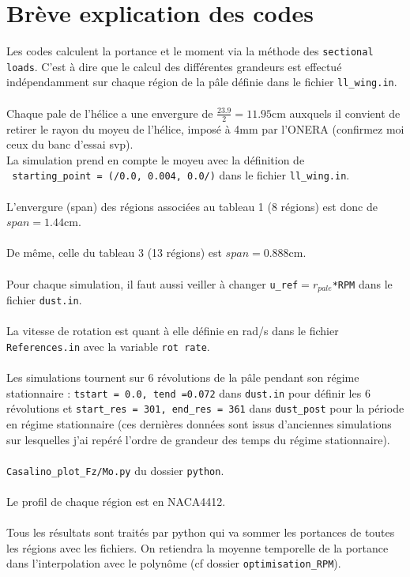 \documentclass{article}
\begin{document}
	\section{Brève explication des codes}
	Les codes calculent la portance et le moment via la méthode des \verb !sectional loads!. C'est à dire que le calcul des différentes grandeurs est effectué indépendamment sur chaque région de la pâle définie dans le fichier \verb!ll_wing.in!.\\ \\
	Chaque pale de l'hélice a une envergure de $\frac{23.9}{2}=11.95$cm auxquels il convient de retirer le rayon du moyeu de l'hélice, imposé à 4mm par l'ONERA (confirmez moi ceux du banc d'essai svp). \\La simulation prend en compte le moyeu avec la définition de \\ \verb! starting_point = (/0.0, 0.004, 0.0/)! dans le fichier \verb!ll_wing.in!. \\\\
	L'envergure (span) des régions associées au tableau 1 (8 régions) est donc de $span = 1.44$cm.\\ \\
	De même, celle du tableau 3 (13 régions) est $span = 0.888$cm.\\ \\
	Pour chaque simulation, il faut aussi veiller à changer \verb !u_ref!$ = r_{pale}$\verb!*RPM! dans le fichier \verb!dust.in!.\\ \\
	La vitesse de rotation est quant à elle définie en rad/s dans le fichier \verb!References.in! avec la variable \verb!rot rate!.\\ \\
	 Les simulations tournent sur 6 révolutions de la pâle pendant son régime stationnaire : \verb !tstart = 0.0, tend =0.072! dans \verb!dust.in! pour définir les 6 révolutions et \verb!start_res = 301, end_res = 361! dans \verb!dust_post! pour la période en régime stationnaire (ces dernières données sont issus d'anciennes simulations sur lesquelles j'ai repéré l'ordre de grandeur des temps du régime stationnaire). \\ \\
	 \verb!Casalino_plot_Fz/Mo.py! du dossier \verb!python!. \\ \\ 
	Le profil de chaque région est en NACA4412. \\ \\
	Tous les résultats sont traités par python qui va sommer les portances de toutes les régions avec les fichiers. On retiendra la moyenne temporelle de la portance dans l'interpolation avec le polynôme (cf  dossier \verb!optimisation_RPM!).\\ \\
\end{document}
